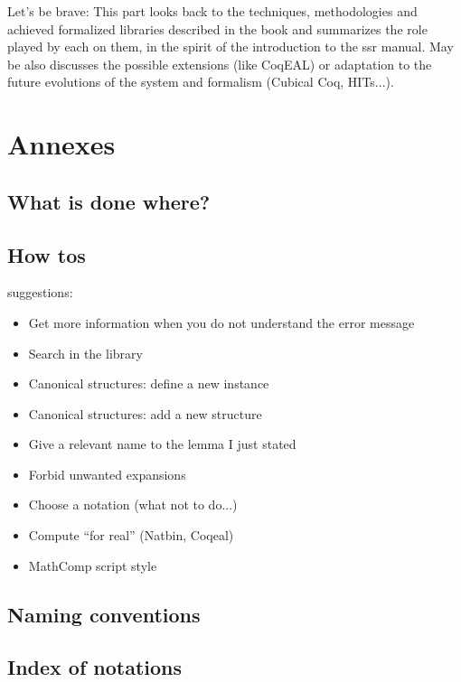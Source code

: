 \documentclass{book}
\begin{document}
Let's be brave:
This part looks back to the techniques, methodologies and achieved
formalized libraries described in the book and summarizes the role
played by each on them, in the spirit of the introduction to the ssr manual.
May be also discusses the possible extensions
(like CoqEAL) or adaptation to the future evolutions of the system and
formalism (Cubical Coq, HITs...).

\part{Annexes}

\chapter{What is done where?}

\chapter{How tos}
suggestions:
\begin{itemize}
\item Get more information when you do not understand the error
  message
\item Search in the library
\item Canonical structures: define a new instance
\item Canonical structures: add a new structure
\item Give a relevant name to the lemma I just stated
\item Forbid unwanted expansions
\item Choose a notation (what not to do...)
\item Compute ``for real'' (Natbin, Coqeal)
\item MathComp script style
\end{itemize}
\chapter{Naming conventions}

\chapter{Index of notations}
\end{document}
